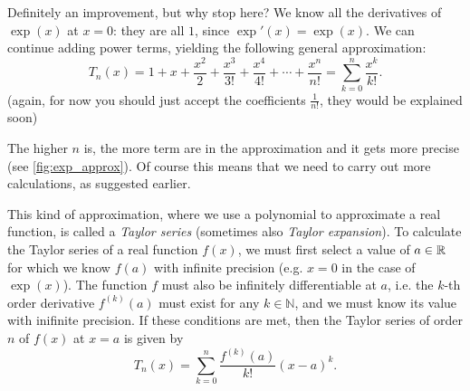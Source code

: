 Definitely an improvement, but why stop here? We know all the derivatives of $\exp(x)$ at $x=0$: they are all $1$, since $\exp'(x)=\exp(x)$. We can continue adding power terms, yielding the following general approximation:
\begin{equation}
  T_{n}(x) = 1 + x + \frac{x^{2}}{2} + \frac{x^{3}}{3!} + \frac{x^{4}}{4!} + \cdots + \frac{x^{n}}{n!} = \sum\limits_{k=0}^{n}\frac{x^{k}}{k!}.
  \label{eq:n_order_approx_exp}
\end{equation}
(again, for now you should just accept the coefficients $\frac{1}{n!}$, they would be explained soon)

The higher $n$ is, the more term are in the approximation and it gets more precise (see \autoref{fig:exp_approx}). Of course this means that we need to carry out more calculations, as suggested earlier.

\newcommand{\taylorExp}[1]{
  \begin{subfigure}[b]{0.45\textwidth}
    \centering
    \begin{tikzpicture}
      \begin{axis}[
        graph2d,
        width=7.5cm, height=6cm,
        xmin=-5, xmax=5,
        ymin=-4, ymax=13,
        major grid style={black!10},
        minor grid style={black!5},
        declare function={expTaylor(\k,\x)=\x^\k/factorial(\k);},
        ]
        \addplot[function, xred] {exp(x)} node[above, pos=0.1, xshift=-5mm]{$\exp(x)$};
        \pgfmathtruncatemacro{\n}{#1}
        \addplot[function, xblue, summand=expTaylor] {1+sum(\n,\x)};
        \node[draw=xblue, thick, rounded corners, fill=white, align=left, text=xblue] at (-4,10) {$n=\n$};
      \end{axis}
    \end{tikzpicture}
  \end{subfigure}
  \hfill
}


This kind of approximation, where we use a polynomial to approximate a real function, is called a \emph{Taylor series} (sometimes also \emph{Taylor expansion}). To calculate the Taylor series of a real function $f(x)$, we must first select a value of $a\in\mathbb{R}^{}$ for which we know $f(a)$ with infinite precision (e.g. $x=0$ in the case of $\exp(x)$). The function $f$ must also be infinitely differentiable at $a$, i.e. the $k$-th order derivative $f^{(k)}(a)$ must exist for any $k\in\mathbb{N}$, and we must know its value with inifinite precision. If these conditions are met, then the Taylor series of order $n$ of $f(x)$ at $x=a$ is given by
\begin{equation}
  T_{n}(x) = \sum\limits_{k=0}^{n}\frac{f^{(k)}(a)}{k!}(x-a)^{k}.
  \label{eq:taylor_series}
\end{equation}

